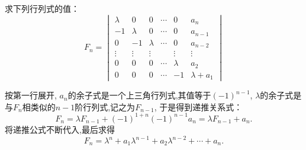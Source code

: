\begin{example}
  求下列行列式的值：
  \begin{equation*}
    F_n =
    \begin{vmatrix}
      \lambda & 0 & 0 & \cdots & 0 & a_n\\
      -1 & \lambda & 0 & \cdots & 0 & a_{n-1}\\
      0 & -1 & \lambda & \cdots & 0 & a_{n-2}\\
      \vdots & \vdots & \vdots &  & \vdots & \vdots\\
      0 & 0 & 0 & \cdots & \lambda & a_2\\
      0 & 0 & 0 & \cdots & -1 & \lambda + a_1
    \end{vmatrix}
  \end{equation*}
\end{example}

\begin{solution}
  按第一行展开, $a_n$的余子式是一个上三角行列式,其值等于$(-1)^{n-1}$,
  $\lambda$的余子式是与$F_n$相类似的$n-1$阶行列式,记之为$F_{n-1}$,
  于是得到递推关系式：
  \begin{equation*}
    F_n = \lambda F_{n-1}+(-1)^{1+n}(-1)^{n-1}a_n= \lambda F_{n-1}+a_n.
  \end{equation*}
  将递推公式不断代入,最后求得
  \begin{equation*}
    F_n=\lambda^n+a_1\lambda^{n-1}+a_2\lambda^{n-2}+\cdots+a_n.
  \end{equation*}
\end{solution}

